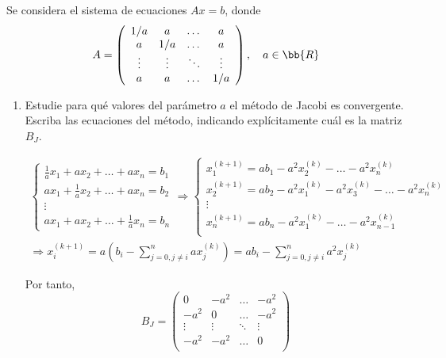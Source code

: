 \documentclass[12pt]{article}
\begin{document}
\begin{ejercicio} 
     Se considera el sistema de ecuaciones $Ax = b$, donde
    \begin{equation*}
        A= \left( \begin{array}{cccc}
            1/a & a & \dots & a \\
            a & 1/a & \dots & a \\
            \vdots & \vdots & \ddots & \vdots \\
            a & a & \dots & 1/a\\
        \end{array}\right), \quad a\in \bb{R}
    \end{equation*}

    \begin{enumerate}
        \item Estudie para qué valores del parámetro $a$ el método de Jacobi es convergente. Escriba las ecuaciones del método, indicando explícitamente cuál es la matriz $B_J$.

        \begin{multline*}
            \left\{ \begin{array}{l}
                 \frac{1}{a}x_1 + ax_2 + \dots + ax_n = b_1 \\
                 ax_1 + \frac{1}{a}x_2 + \dots + ax_n = b_2 \\
                 \vdots \\
                 ax_1 + ax_2 + \dots + \frac{1}{a}x_n = b_n
            \end{array} \right.
            \Longrightarrow
            \left\{ \begin{array}{l}
                 x_1^{(k+1)} = ab_1 - a^2x_2^{(k)} - \dots - a^2x_n^{(k)} \\
                 x_2^{(k+1)} = ab_2 - a^2x_1^{(k)} -a^2x_3^{(k)} - \dots - a^2x_n^{(k)} \\
                 \vdots \\
                 x_n^{(k+1)} = ab_n - a^2x_1^{(k)} - \dots - a^2x_{n-1}^{(k)} \\
            \end{array} \right.
            \\
            \Longrightarrow x_i^{(k+1)} = a\left( b_i - \sum_{j=0, j\neq i}^n ax_j^{(k)}\right) = ab_i - \sum_{j=0, j\neq i}^n a^2x_j^{(k)}
        \end{multline*}

        Por tanto,
        \begin{equation*}
            B_J = \left( \begin{array}{cccc}
                0 & -a^2 & \dots & -a^2 \\
                -a^2 & 0 & \dots & -a^2 \\
                \vdots & \vdots & \ddots & \vdots \\
                -a^2 & -a^2 & \dots & 0\\
            \end{array}\right)
        \end{equation*}


\end{enumerate}
\end{ejercicio}
\end{document}
